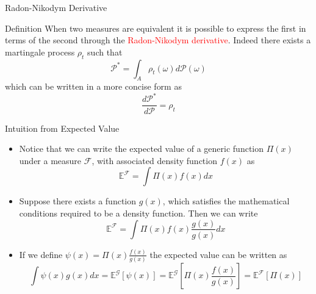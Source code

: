 \documentclass{beamer}
\begin{document}
\begin{frame}{Radon-Nikodym Derivative}
\begin{block}{Definition}
When two measures are equivalent it is possible to express the first in terms of the second through the \textcolor{red}{Radon-Nikodym derivative}. Indeed there exists a martingale process $\rho_t$ such that
\begin{equation*}
	\mathcal{P}^* =\int_{A} \rho_t(\omega)d\mathcal{P}(\omega)
\end{equation*}
which can be written in a more concise form as
\begin{equation}
	\frac{d\mathcal{P}^*}{d\mathcal{P}} = \rho_t
	\label{eq:radon_nikodym_der}
\end{equation}
\end{block}
\end{frame}

\begin{frame}{Intuition from Expected Value}
	\begin{itemize}
		\item Notice that we can write the expected value of a generic function $\Pi(x)$ under a measure $\mathcal{F}$, with associated density function $f(x)$ as
		\begin{equation*}
			\mathbb{E}^{\mathcal{F}}=\int\Pi(x)f(x)dx
		\end{equation*}
		\item Suppose there exists a function $g(x)$, which satisfies the mathematical conditions required to be a density function. Then we can write
		\begin{equation*}
			\mathbb{E}^{\mathcal{F}}=\int\Pi(x)f(x)\frac{g(x)}{g(x)}dx
		\end{equation*}
		\item If we define $\psi(x)=\Pi(x)\frac{f(x)}{g(x)}$ the expected value can be written as 
		\begin{equation*}
			\int\psi(x)g(x)dx=\mathbb{E}^{\mathcal{G}}\left[\psi(x)\right]=\mathbb{E}^{\mathcal{G}}\left[\Pi(x)\frac{f(x)}{g(x)}\right]=\mathbb{E}^{\mathcal{F}}\left[\Pi(x)\right]
		\end{equation*}
	\end{itemize}
\end{frame}
\end{document}

